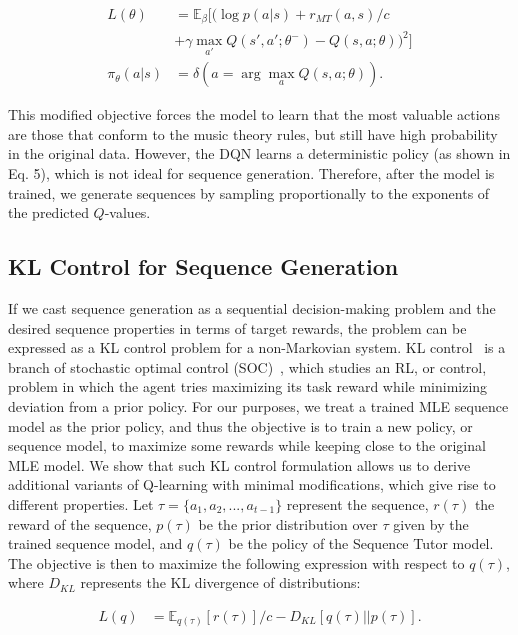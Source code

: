 \begin{align} 
\label{eq:mod_q_loss}
L(\theta) &= \mathbb{E}_\beta[(\log p(a|s) + r_{MT}(a,s)/c \\
&+ \gamma \max_{a'}Q(s',a';\theta^-) - Q(s,a;\theta))^2] \nonumber \\
\pi_\theta(a|s) &= \delta(a = \arg\max_{a}Q(s,a;\theta)).
\end{align}

This modified objective forces the model to learn that the most valuable actions are those that conform to the music theory rules, but still have high probability in the original data. However, the DQN learns a deterministic policy (as shown in Eq. 5), which is not ideal for sequence generation. Therefore, after the model is trained, we generate sequences by sampling proportionally to the exponents of the predicted $Q$-values.

\subsection{KL Control for Sequence Generation}
\label{sec:SOC}
If we cast sequence generation as a sequential decision-making problem and the desired sequence properties in terms of target rewards, the problem can be expressed as a KL control problem for a non-Markovian system. KL control~\citep{todorov2006linearly,kappen2012optimal,rawlik2012stochastic} is a branch of stochastic optimal control (SOC)~\citep{stengel1986stochastic}, which studies an RL, or control, problem in which the agent tries maximizing its task reward while minimizing deviation from a prior policy. For our purposes, we treat a trained MLE sequence model as the prior policy, and thus the objective is to train a new policy, or sequence model, to maximize some rewards while keeping close to the original MLE model. We show that such KL control formulation allows us to derive additional variants of Q-learning with minimal modifications, which give rise to different properties. Let $\tau=\{a_1,a_2,...,a_{t-1}\}$ represent the sequence, $r(\tau)$ the reward of the sequence, $p(\tau)$ be the prior distribution over $\tau$ given by the trained sequence model, and $q(\tau)$ be the policy of the Sequence Tutor model. The objective is then to maximize the following expression with respect to $q(\tau)$, where $D_{KL}$ represents the KL divergence of distributions:

\begin{align} 
\label{eq:kl_control}
L(q) &= \mathbb{E}_{q(\tau)}[r(\tau)]/c - D_{KL}[q(\tau)||p(\tau)].
\end{align}

